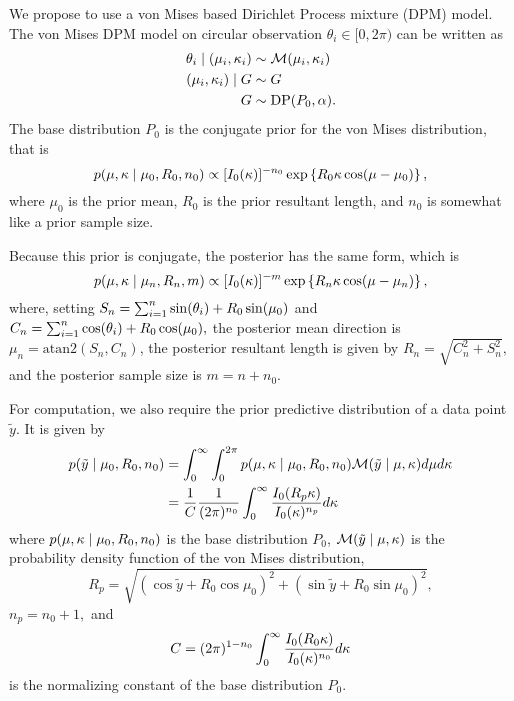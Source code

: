 We propose to use a von Mises based Dirichlet Process mixture (DPM) model. The von Mises DPM model on circular observation $\theta_i \in [0, 2\pi)$ can be written as
\begin{align}
\theta_i \mid (\mu_i, \kappa_i) &\sim \mathcal{M}(\mu_i, \kappa_i) \\
(\mu_i, \kappa_i) \mid G  &\sim G \\
G &\sim \text{DP}(P_0, \alpha).
\end{align}
The base distribution $P_0$ is the conjugate prior for the von Mises distribution, that is
\begin{equation}
p(\mu, \kappa \mid \mu_0, R_0, n_0) \propto [I_0(\kappa)]^{-n_0} \exp\left\{ R_0 \kappa \cos(\mu - \mu_0)\right\},
\end{equation}
where $\mu_0$ is the prior mean, $R_0$ is the prior resultant length, and $n_0$ is somewhat like a prior sample size.

Because this prior is conjugate, the posterior has the same form, which is
\begin{equation}
p(\mu, \kappa \mid \mu_n, R_n, m) \propto [I_0(\kappa)]^{-m} \exp\left\{ R_n \kappa \cos(\mu - \mu_n)\right\},
\end{equation}
where, setting $S_n = \sum_{i=1}^n \sin(\theta_i) + R_0 \sin(\mu_0)$ and $C_n =  \sum_{i=1}^n \cos(\theta_i) + R_0 \cos(\mu_0),$  the posterior mean direction is $\mu_n = \text{atan2} \left(S_n, C_n\right)$, the posterior resultant length is given by $R_n = \sqrt{C_n^2 + S_n^2},$ and the posterior sample size is $m = n + n_0$.

For computation, we also require the prior predictive distribution of a data point $\tilde{y}$.  It is given by
\begin{align}
p(\tilde{y}\mid \mu_0, R_0, n_0) &= \int_{0}^\infty \int_0^{2\pi} p(\mu, \kappa \mid \mu_0, R_0, n_0) \mathcal{M}(\tilde{y} \mid \mu, \kappa) d\mu d\kappa \\
&= \frac{1}{C}  \frac{1}{(2\pi)^{n_0}} \int_{0}^\infty \frac{I_0(R_p\kappa)}{I_0(\kappa)^{n_p}} d\kappa
\end{align}
where $p(\mu, \kappa \mid \mu_0, R_0, n_0)$ is the base distribution $P_0$, $ \mathcal{M}(\tilde{y} \mid \mu, \kappa)$ is the probability density function of the von Mises distribution,
\begin{equation}
R_p = \sqrt{\left(\cos{\tilde{y}} + R_0 \cos \mu_0 \right)^2 + \left(\sin{\tilde{y}} + R_0 \sin \mu_0 \right)^2},
\end{equation}
$n_p = n_0 + 1,$ and
\begin{equation}
C = (2\pi)^{1 - n_0} \int_{0}^\infty \frac{I_0(R_0\kappa)}{I_0(\kappa)^{n_0}} d\kappa
\end{equation}
is the normalizing constant of the base distribution $P_0$.

